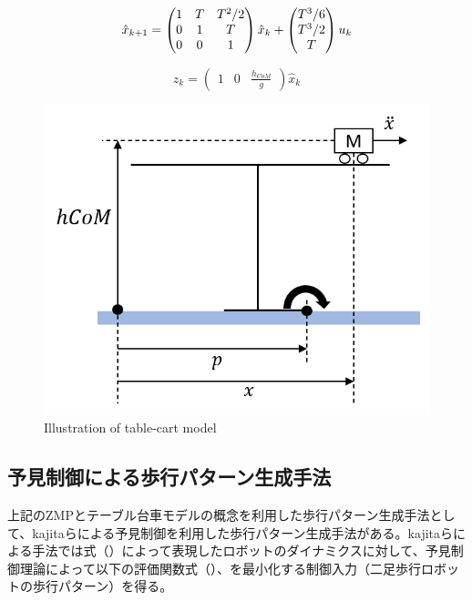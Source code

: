 \begin{equation}
  \hat{x}_{k+1}=
  \begin{pmatrix}
    1&T&T^{2}/2\cr 0&1&T\cr 0&0&1
  \end{pmatrix}
  \hat{x}_{k} +
  \begin{pmatrix}
    T^{3}/6 \\  T^{3}/2 \\ T
  \end{pmatrix}
  u_{k}
\end{equation}

\begin{equation}
  z_{k} =
  \begin{pmatrix}
   1 & 0 & \frac{h_{CoM}}{g}
  \end{pmatrix}
  \hat{x}_{k}
\end{equation}

\begin{figure}[hbtp]
  \centering
  \includegraphics[keepaspectratio, scale=0.6]
  {images/table_cart_hcom.png}
  \caption{Illustration of table-cart model }
  \label{Fig:tablecart}
\end{figure}



\newpage

\subsection{予見制御による歩行パターン生成手法}
上記のZMPとテーブル台車モデルの概念を利用した歩行パターン生成手法として、kajitaらによる予見制御を利用した歩行パターン生成手法\cite{PREVIEW}がある。kajitaらによる手法では式（）によって表現したロボットのダイナミクスに対して、予見制御理論によって以下の評価関数式（）、を最小化する制御入力（二足歩行ロボットの歩行パターン）を得る。

